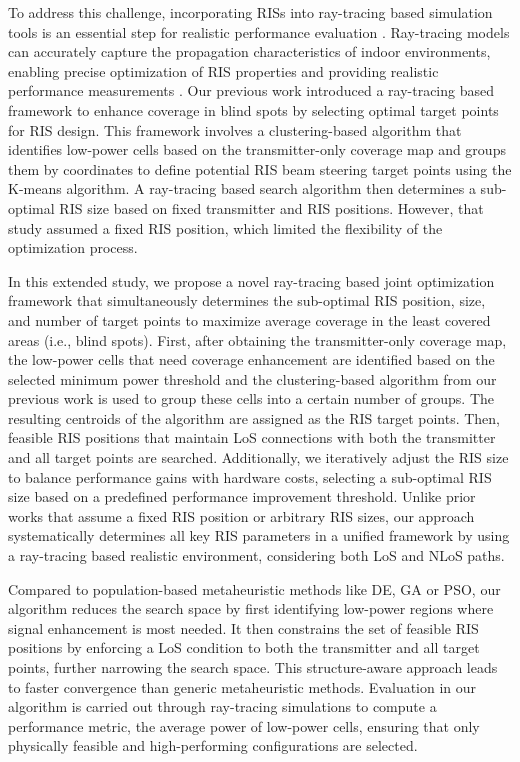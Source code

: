 \documentclass{IEEEoj}
\begin{document}
To address this challenge, incorporating RISs into ray-tracing based simulation tools is an essential step for realistic performance evaluation \cite{RT1}. Ray-tracing models can accurately capture the propagation characteristics of indoor environments, enabling precise optimization of RIS properties and providing realistic performance measurements \cite{RT2,RT3}. Our previous work \cite{emre_claude_eucap_paper} introduced a ray-tracing based framework to enhance coverage in blind spots by selecting optimal target points for RIS design. This framework involves a clustering-based algorithm that identifies low-power cells based on the transmitter-only coverage map and groups them by coordinates to define potential RIS beam steering target points using the K-means algorithm. A ray-tracing based search algorithm then determines a sub-optimal RIS size based on fixed transmitter and RIS positions. However, that study assumed a fixed RIS position, which limited the flexibility of the optimization process.

In this extended study, we propose a novel ray-tracing based joint optimization framework that simultaneously determines the sub-optimal RIS position, size, and number of target points to maximize average coverage in the least covered areas (i.e., blind spots). First, after obtaining the transmitter-only coverage map, the low-power cells that need coverage enhancement are identified based on the selected minimum power threshold and the clustering-based algorithm from our previous work \cite{emre_claude_eucap_paper} is used to group these cells into a certain number of groups. The resulting centroids of the algorithm are assigned as the RIS target points. Then, feasible RIS positions that maintain LoS connections with both the transmitter and all target points are searched. Additionally, we iteratively adjust the RIS size to balance performance gains with hardware costs, selecting a sub-optimal RIS size based on a predefined performance improvement threshold. Unlike prior works that assume a fixed RIS position or arbitrary RIS sizes, our approach systematically determines all key RIS parameters in a unified framework by using a ray-tracing based realistic environment, considering both LoS and NLoS paths.

Compared to population-based metaheuristic methods like DE, GA or PSO, our algorithm reduces the search space by first identifying low-power regions where signal enhancement is most needed. It then constrains the set of feasible RIS positions by enforcing a LoS condition to both the transmitter and all target points, further narrowing the search space. This structure-aware approach leads to faster convergence than generic metaheuristic methods. Evaluation in our algorithm is carried out through ray-tracing simulations to compute a performance metric, the average power of low-power cells, ensuring that only physically feasible and high-performing configurations are selected.
\end{document}
